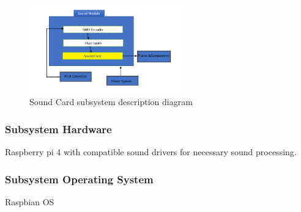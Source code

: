 \begin{figure}[h!]
	\centering
 	\includegraphics[width=0.60\textwidth]{images/sound card.png}
 \caption{Sound Card subsystem description diagram}
\end{figure}

\subsubsection{Subsystem Hardware}
Raspberry pi 4 with compatible sound drivers for necessary sound processing.

\subsubsection{Subsystem Operating System}
Raspbian OS 









